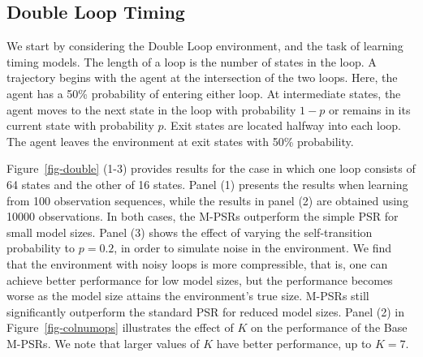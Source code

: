 \documentclass[letterpaper]{article}
\begin{document}

\subsection{Double Loop Timing}

We start by considering the Double Loop environment, and the task of learning timing models. The length of a loop is the number of states in the loop. A trajectory begins with the agent at the intersection of the two loops. Here, the agent has a 50\% probability of entering either loop. At intermediate states, the agent moves to the next state in the loop with probability $1-p$ or remains in its current state with probability $p$. Exit states are located halfway into each loop. The agent leaves the environment at exit states with 50\% probability. 


Figure~\ref{fig-double} (1-3) provides results for the case in which one loop consists of 64 states and the other of 16 states. Panel (1) presents the results when learning from  100 observation sequences, while the results in panel (2) are obtained using 10000 observations. In both cases, the M-PSRs outperform the simple PSR for small model sizes. Panel (3) shows the effect of varying the self-transition probability to $p = 0.2$, in order to simulate noise in the environment. We find that the environment with noisy loops is more compressible, that is, one can achieve better performance for low model sizes, but the performance becomes worse as the model size attains the environment's true size. M-PSRs still significantly outperform the standard PSR for reduced model sizes. Panel (2) in Figure~\ref{fig-colnumops} illustrates the effect of $K$ on the performance of the Base M-PSRs. We note that larger values of $K$ have better performance, up to $K=7$.
\end{document}
